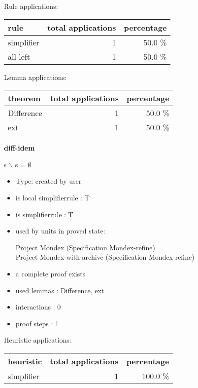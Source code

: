 \documentclass[a4paper]{article}
\begin{document}
Rule applications:

\begin{supertabular}{l|r|r}
rule	        & total applications & percentage \\ \hline
simplifier & 1 & 50.0 \% \\
all left & 1 & 50.0 \% \\

\end{supertabular}

Lemma applications:

\begin{supertabular}{l|r|r}
theorem	        & total applications & percentage \\ \hline
Difference & 1 & 50.0 \% \\
ext & 1 & 50.0 \% \\

\end{supertabular}
\pagebreak

{\LARGE\bf diff-idem}\label{lemma-diff-idem}

\medskip

 \Fol s $\backslash$ s = $\emptyset$

\begin{itemize}

\item Type: created by user

\item is local simplifierrule : T
\item is simplifierrule : T
\item used by units in proved state:

Project Mondex (Specification Mondex-refine) \\
Project Mondex-with-archive (Specification Mondex-refine)
\item       a complete proof exists
\item       used lemmas  : Difference, ext
\item       interactions : 0
\item       proof steps  : 1
\end{itemize}

\medskip


Heuristic applications:

\begin{supertabular}{l|r|r}
heuristic	& total applications & percentage \\ \hline
simplifier & 1 & 100.0 \% \\

\end{supertabular}
\end{document}
